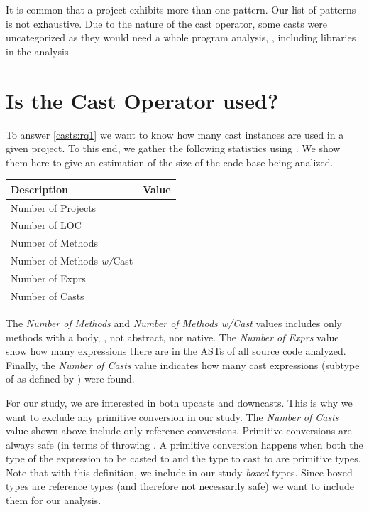 It is common that a project exhibits more than one pattern.
Our list of patterns is not exhaustive.
Due to the nature of the cast operator, some casts were uncategorized as they would need a whole program analysis, \eg{}, including libraries in the analysis.


\section{Is the Cast Operator used?}
\label{sec:casts:stats}

To answer \ref{casts:rq1} we want to know how many cast instances are used in a given project.
To this end, we gather the following statistics using \ql{}.
We show them here to give an estimation of the size of the code base being analized.

\begin{center}
\begin{tabular}{lr}
	Description & Value\\
	\hline
	Number of Projects & \nproject{} \\
	Number of LOC & \nloc{} \\
	Number of Methods & \nmethod{} \\
	Number of Methods \emph{w/}Cast & \nmethodwithcast{} \\
	Number of Exprs & \nexpr{} \\
	Number of Casts & \ncast{} \\
\end{tabular}
\end{center}

The \emph{Number of Methods} and \emph{Number of Methods w/Cast} values includes only methods with a body, \ie{}, not abstract, nor native.
The \emph{Number of Exprs} value show how many expressions there are in the ASTs of all source code analyzed.
Finally, the \emph{Number of Casts} value indicates how many cast expressions (subtype of  as defined by \ql{}) were found.

For our study, we are interested in both upcasts and downcasts.
This is why we want to exclude any primitive conversion in our study.
The \emph{Number of Casts} value shown above include only reference conversions.
Primitive conversions are always safe (in terms of throwing .
A primitive conversion happens when both the type of the expression to be casted to and the type to cast to are primitive types.
Note that with this definition, we include in our study \emph{boxed} types.
Since boxed types are reference types (and therefore not necessarily safe)
we want to include them for our analysis.

